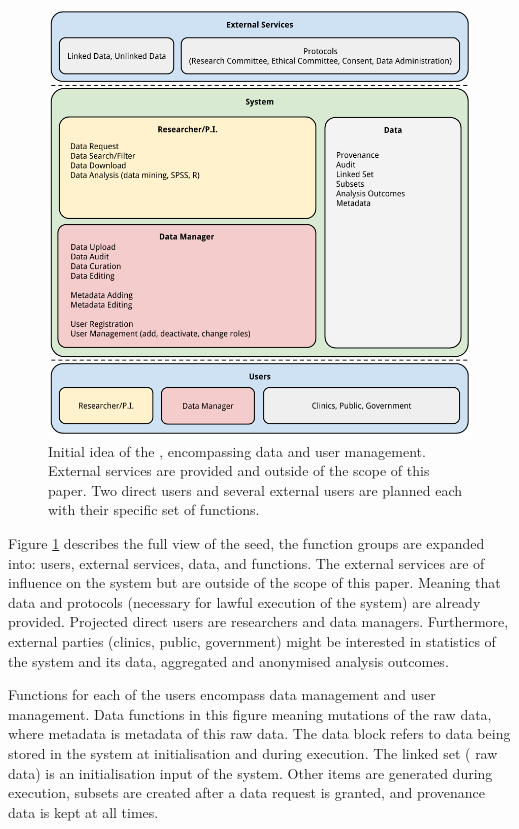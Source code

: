 \begin{figure}[t]
	\centering
	\includegraphics[width=1.0\linewidth]{images/brainstorm-before}
	\caption{
		Initial idea of the \ivfsystem{}, encompassing data and user management.
		External services are provided and outside of the scope of this paper.
		Two direct users and several external users are planned each with their specific set of functions.
	}
	\label{fig:brainstorm-before}
\end{figure}

Figure \ref{fig:brainstorm-before} describes the full view of the seed, the function groups are expanded into: users, external services, data, and functions.
The external services are of influence on the system but are outside of the scope of this paper.
Meaning that data and protocols (necessary for lawful execution of the system) are already provided.
Projected direct users are researchers and data managers.
Furthermore, external parties (clinics, public, government) might be interested in statistics of the system and its data, \eg{} aggregated and anonymised analysis outcomes.

Functions for each of the users encompass data management and user management.
Data functions in this figure meaning mutations of the raw \project{} data, where metadata is metadata of this raw data.
The data block refers to data being stored in the system at initialisation and during execution.
The linked set (\ie{} raw data) is an initialisation input of the system.
Other items are generated during execution, \eg{} subsets are created after a data request is granted, and provenance data is kept at all times.